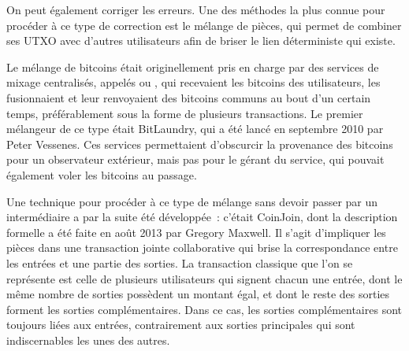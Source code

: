 On peut également corriger les erreurs. Une des méthodes la plus connue pour procéder à ce type de correction est le mélange de pièces, qui permet de combiner ses UTXO avec d'autres utilisateurs afin de briser le lien déterministe qui existe.

Le mélange de bitcoins était originellement pris en charge par des services de mixage centralisés, appelés  ou , qui recevaient les bitcoins des utilisateurs, les fusionnaient et leur renvoyaient des bitcoins communs au bout d'un certain temps, préférablement sous la forme de plusieurs transactions. Le premier mélangeur de ce type était BitLaundry, qui a été lancé en septembre 2010 par Peter Vessenes. Ces services permettaient d'obscurcir la provenance des bitcoins pour un observateur extérieur, mais pas pour le gérant du service, qui pouvait également voler les bitcoins au passage.  %

Une technique pour procéder à ce type de mélange sans devoir passer par un intermédiaire a par la suite été développée~: c'était CoinJoin, dont la description formelle a été faite en août 2013 par Gregory Maxwell. Il s'agit d'impliquer les pièces dans une transaction jointe collaborative qui brise la correspondance entre les entrées et une partie des sorties. La transaction classique que l'on se représente est celle de plusieurs utilisateurs qui signent chacun une entrée, dont le même nombre de sorties possèdent un montant égal, et dont le reste des sorties forment les sorties complémentaires. Dans ce cas, les sorties complémentaires sont toujours liées aux entrées, contrairement aux sorties principales qui sont indiscernables les unes des autres.

